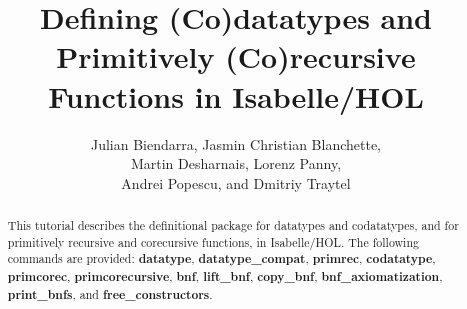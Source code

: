 \documentclass[12pt,a4paper]{article} %
\title{%
Defining (Co)datatypes and Primitively (Co)recursive Functions in Isabelle/HOL}
\author{Julian Biendarra, Jasmin Christian Blanchette, \\
Martin Desharnais, Lorenz Panny, \\
Andrei Popescu, and Dmitriy Traytel}
\renewcommand\_{\hbox{\textunderscore\kern-.05ex}}
\newcommand{\keyw}[1]{\textbf{#1}}
\begin{document}
\maketitle

\begin{sloppy}
\begin{abstract}
\noindent
This tutorial describes the definitional package for datatypes and codatatypes,
and for primitively recursive and corecursive functions, in Isabelle/HOL. The
following commands are provided:
\keyw{datatype}, \keyw{datatype_\allowbreak compat}, \keyw{prim\-rec}, \keyw{co\-data\-type},
\keyw{prim\-co\-rec}, \keyw{prim\-co\-recursive}, \keyw{bnf}, \keyw{lift_\allowbreak bnf},
\keyw{copy_\allowbreak bnf}, \keyw{bnf_\allowbreak axiom\-atization},
\keyw{print_\allowbreak bnfs}, and \keyw{free_\allowbreak constructors}.
\end{abstract}
\end{sloppy}

\tableofcontents



\let\em=\sl
{}

\end{document}
